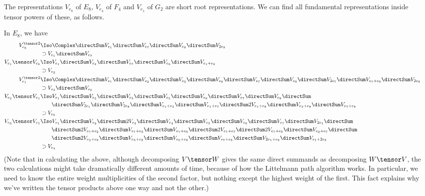 The representations $V_{e_8}$ of $E_8$, $V_{e_4}$ of $F_4$ and $V_{e_1}$ of $G_2$ are short root representations. We can find all fundamental
representations inside tensor powers of these, as follows.

In $E_8$, we have
\begin{align*}
V_{e_8}^{\tensor 2}     & \Iso \Complex \directSum V_{e_1} \directSum V_{e_7} \directSum V_{e_8} \directSum V_{2e_8} \\
                        & \supset V_{e_1} \directSum V_{e_7} \\
V_{e_1} \tensor V_{e_8} & \Iso V_{e_1} \directSum V_{e_2} \directSum V_{e_7} \directSum V_{e_8} \directSum V_{e_1+e_8} \\
                        & \supset V_{e_2} \\
V_{e_1}^{\tensor 2}     & \Iso \Complex \directSum V_{e_1} \directSum V_{e_2} \directSum V_{e_3} \directSum V_{e_6} \directSum V_{e_7} \directSum V_{e_8} \directSum V_{2e_1} \directSum V_{e_1+e_8} \directSum V_{2e_8} \\
                        & \supset V_{e_3} \directSum V_{e_6} \\
V_{e_2} \tensor V_{e_1} & \Iso V_{e_1} \directSum V_{e_2} \directSum V_{e_3} \directSum V_{e_5} \directSum V_{e_6} \directSum V_{e_7} \directSum V_{e_8} \directSum \\
                        & \qquad  \directSum V_{2e_1} \directSum V_{2e_8} \directSum V_{e_1+e_2} \directSum V_{e_1+e_7} \directSum 2V_{e_1+e_8} \directSum V_{e_2+e_8} \directSum V_{e_7+e_8}\\
                        & \supset V_{e_5} \\
V_{e_3} \tensor V_{e_1} & \Iso V_{e_1} \directSum V_{e_2} \directSum 2V_{e_3} \directSum V_{e_4} \directSum V_{e_5} \directSum V_{e_6} \directSum V_{e_7} \directSum V_{2e_1} \directSum \\
                        & \qquad \directSum 2V_{e_1+e_2} \directSum V_{e_1+e_3} \directSum V_{e_1+e_6} \directSum 2V_{e_1+e_7} \directSum 2V_{e_1+e_8} \directSum V_{e_2+e_7} \directSum \\
                        & \qquad \directSum 2V_{e_2+e_8} \directSum V_{e_3+e_8} \directSum V_{e_6+e_8} \directSum V_{e_7+e_8} \directSum V_{2e_1+e_8} \directSum V_{e_1+2e_8}\\
                        & \supset V_{e_4}
\end{align*}
(Note that in calculating the above, although decomposing $V \tensor W$ gives the same direct summands as decomposing $W \tensor V$, the two calculations
might take dramatically different amounts of time, because of how the Littelmann path algorithm works. In particular, we need to know the entire weight multiplicities of the second factor, but nothing except the highest weight of the first.
This fact explains why we've written the tensor products above one way and not the other.)

